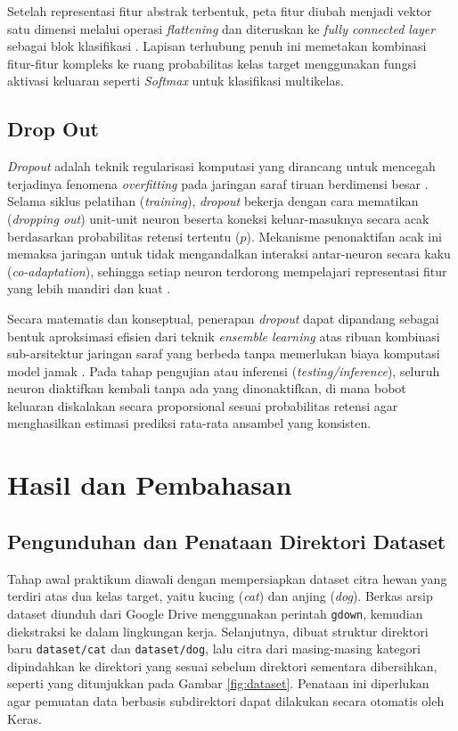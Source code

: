 \documentclass[12pt, a4paper]{article}
\begin{document}
Setelah representasi fitur abstrak terbentuk, peta fitur diubah menjadi vektor satu dimensi melalui operasi \textit{flattening} dan diteruskan ke \textit{fully connected layer} sebagai blok klasifikasi \cite{alzubaidi2021review}. Lapisan terhubung penuh ini memetakan kombinasi fitur-fitur kompleks ke ruang probabilitas kelas target menggunakan fungsi aktivasi keluaran seperti \textit{Softmax} untuk klasifikasi multikelas.

\subsection{Drop Out}
\textit{Dropout} adalah teknik regularisasi komputasi yang dirancang untuk mencegah terjadinya fenomena \textit{overfitting} pada jaringan saraf tiruan berdimensi besar \cite{srivastava2014dropout}. Selama siklus pelatihan (\textit{training}), \textit{dropout} bekerja dengan cara mematikan (\textit{dropping out}) unit-unit neuron beserta koneksi keluar-masuknya secara acak berdasarkan probabilitas retensi tertentu ($p$). Mekanisme penonaktifan acak ini memaksa jaringan untuk tidak mengandalkan interaksi antar-neuron secara kaku (\textit{co-adaptation}), sehingga setiap neuron terdorong mempelajari representasi fitur yang lebih mandiri dan kuat \cite{srivastava2014dropout}.

Secara matematis dan konseptual, penerapan \textit{dropout} dapat dipandang sebagai bentuk aproksimasi efisien dari teknik \textit{ensemble learning} atas ribuan kombinasi sub-arsitektur jaringan saraf yang berbeda tanpa memerlukan biaya komputasi model jamak \cite{srivastava2014dropout, alzubaidi2021review}. Pada tahap pengujian atau inferensi (\textit{testing/inference}), seluruh neuron diaktifkan kembali tanpa ada yang dinonaktifkan, di mana bobot keluaran diskalakan secara proporsional sesuai probabilitas retensi agar menghasilkan estimasi prediksi rata-rata ansambel yang konsisten.

\section{Hasil dan Pembahasan}

\subsection{Pengunduhan dan Penataan Direktori Dataset}
Tahap awal praktikum diawali dengan mempersiapkan dataset citra hewan yang terdiri atas dua kelas target, yaitu kucing (\textit{cat}) dan anjing (\textit{dog}). Berkas arsip dataset diunduh dari Google Drive menggunakan perintah \texttt{gdown}, kemudian diekstraksi ke dalam lingkungan kerja. Selanjutnya, dibuat struktur direktori baru \texttt{dataset/cat} dan \texttt{dataset/dog}, lalu citra dari masing-masing kategori dipindahkan ke direktori yang sesuai sebelum direktori sementara dibersihkan, seperti yang ditunjukkan pada Gambar \ref{fig:dataset}. Penataan ini diperlukan agar pemuatan data berbasis subdirektori dapat dilakukan secara otomatis oleh Keras.
\end{document}
